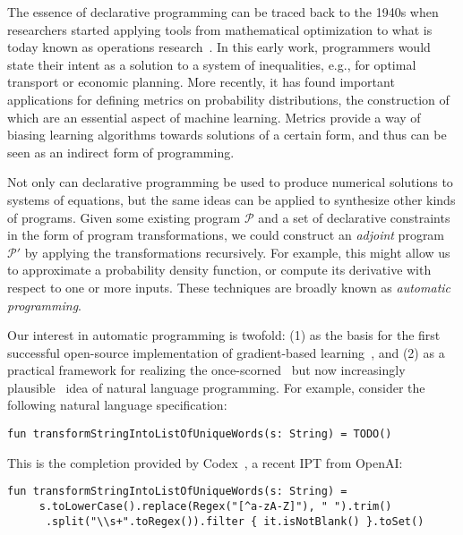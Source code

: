 \documentclass[12pt]{article}
\begin{document}
The essence of declarative programming can be traced back to the 1940s when researchers started applying tools from mathematical optimization to what is today known as operations research~\cite{kantorovich1960mathematical}. In this early work, programmers would state their intent as a solution to a system of inequalities, e.g., for optimal transport or economic planning. More recently, it has found important applications for defining metrics on probability distributions, the construction of which are an essential aspect of machine learning. Metrics provide a way of biasing learning algorithms towards solutions of a certain form, and thus can be seen as an indirect form of programming.

Not only can declarative programming be used to produce numerical solutions to systems of equations, but the same ideas can be applied to synthesize other kinds of programs. Given some existing program $\mathcal P$ and a set of declarative constraints in the form of program transformations, we could construct an \textit{adjoint} program $\mathcal P'$ by applying the transformations recursively. For example, this might allow us to approximate a probability density function, or compute its derivative with respect to one or more inputs. These techniques are broadly known as \textit{automatic programming}.

Our interest in automatic programming is twofold: (1) as the basis for the first successful open-source implementation of gradient-based learning~\cite{baydin2018automatic}, and (2) as a practical framework for realizing the once-scorned~\cite{dijkstra1979foolishness} but now increasingly plausible~\cite{chen2021evaluating} idea of natural language programming. For example, consider the following natural language specification:

\begin{lstlisting}[basicstyle=\footnotesize\ttfamily]
  fun transformStringIntoListOfUniqueWords(s: String) = TODO()
\end{lstlisting}

\noindent This is the completion provided by Codex~\cite{chen2021evaluating}, a recent IPT from OpenAI:

\begin{lstlisting}[basicstyle=\footnotesize\ttfamily]
  fun transformStringIntoListOfUniqueWords(s: String) =
     s.toLowerCase().replace(Regex("[^a-zA-Z]"), " ").trim()
      .split("\\s+".toRegex()).filter { it.isNotBlank() }.toSet()
\end{lstlisting}
\end{document}
